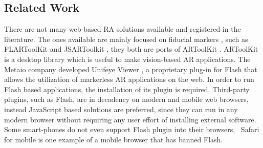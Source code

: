 \subsection{Related Work} %
\label{sub:tracking_library_for_the_web:related_work}

There are not many web-based RA solutions available and registered in the literature. The ones available are mainly focused on fiducial markers \cite{Cho1998}, such as FLARToolKit \cite{Yan2011} and JSARToolkit \cite{JSARToolkit2011}, they both are ports of ARToolKit \cite{Hirokazu2002}. ARToolKit is a desktop library which is useful to make vision-based AR applications. The Metaio company developed Unifeye Viewer \cite{Metaio2009}, a proprietary plug-in for Flash \cite{Flash2013} that allows the utilization of markerless AR applications on the web. In order to run Flash based applications, the installation of its plugin is required. Third-party plugins, such as Flash, are in decadency on modern and mobile web browsers, instead JavaScript based solutions are preferred, since they can run in any modern browser without requiring any user effort of installing external software. Some smart-phones do not even support Flash plugin into their browsers, \eg\ Safari for mobile \cite{Safari2013} is one example of a mobile browser that has banned Flash.

